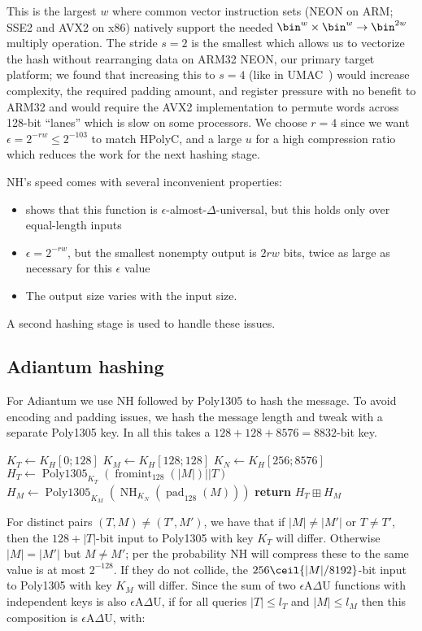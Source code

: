 \documentclass[journal=tosc,preprint,floatrow,submission]{iacrtrans}
\DeclareMathOperator{\Polydjb}{Poly1305}
\DeclareMathOperator{\NH}{NH}
\DeclareMathOperator{\fromint}{fromint}
\DeclareMathOperator{\pad}{pad}
\begin{document}
This is the largest $w$ where common vector instruction sets (NEON on ARM; SSE2
and AVX2 on x86) natively support the needed $\bin^w \times \bin^w \rightarrow
\bin^{2w}$ multiply operation.  The stride $s=2$ is the smallest which allows us
to vectorize the hash without rearranging data on ARM32 NEON, our primary target
platform; we found that increasing this to $s=4$ (like in UMAC~\cite{rfc4418})
would increase complexity, the required padding amount, and register pressure
with no benefit to ARM32 and would require the AVX2 implementation to permute
words across 128-bit ``lanes'' which is slow on some processors.  We choose
$r=4$ since we want $\epsilon = 2^{-rw} \leq 2^{-103}$ to match HPolyC, and a
large $u$ for a high compression ratio which reduces the work for the next
hashing stage.

NH's speed comes with several inconvenient properties:
\begin{itemize}
    \item \cite{umac2} shows that this function is $\epsilon$-almost-$\Delta$-universal, but this
        holds only over equal-length inputs
    \item $\epsilon = 2^{-rw}$, but the smallest nonempty output is $2rw$ bits, twice as large
        as necessary for this $\epsilon$ value
    \item The output size varies with the input size.
\end{itemize}
A second hashing stage is used to handle these issues.

\subsection{Adiantum hashing}

For Adiantum we use NH followed by Poly1305 to hash the message.
To avoid encoding and padding issues, we hash the message length and tweak with
a separate Poly1305 key.
In all this takes a $128 + 128 + 8576 = 8832$-bit key.

\begin{algorithmic}[0]
    \State $K_T \gets K_H[0;128]$
    \State $K_M \gets K_H[128;128]$
    \State $K_N \gets K_H[256;8576]$
    \State $H_T \gets \Polydjb_{K_T}(\fromint_{128}(|M|) || T)$
    \State $H_M \gets \Polydjb_{K_M}(\NH_{K_N}(\pad_{128}(M)))$
    \State \textbf{return} $H_T \boxplus H_M$
    \EndProcedure
\end{algorithmic}

For distinct pairs $(T,M) \neq (T', M')$, we have that if $|M| \neq |M'|$ or $T \neq T'$,
then the $128 + |T|$-bit input to Poly1305 with key $K_T$ will differ.
Otherwise $|M| = |M'|$ but $M \neq M'$;
per \cite{umac2} the probability NH will compress these to the same value is at most
$2^{-128}$. If they do not collide, the $256\ceil{|M|/8192}$-bit input to Poly1305 with key $K_M$
will differ. Since the sum of two $\epsilon$A$\Delta$U functions with independent keys is also
$\epsilon$A$\Delta$U, if for all queries $|T| \leq l_T$ and $|M| \leq l_M$ then
this composition is  $\epsilon$A$\Delta$U, with:
\end{document}
